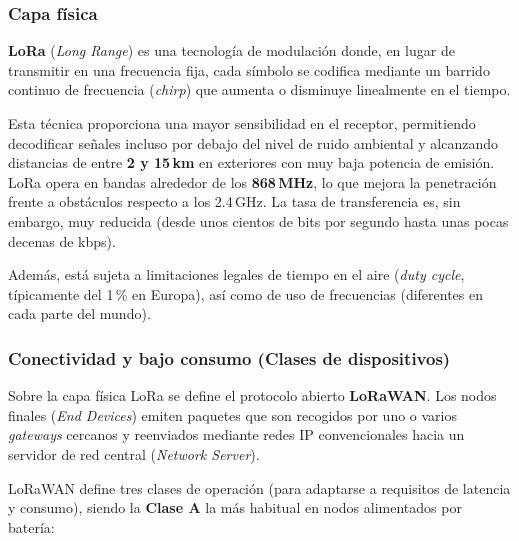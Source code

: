 \documentclass[../main.tex]{subfiles}
\begin{document}
            \subsubsection{Capa física}
                \textbf{LoRa} (\emph{Long Range}) es una tecnología de modulación donde, en lugar de transmitir en una frecuencia fija, cada símbolo se codifica mediante un barrido continuo de frecuencia (\emph{chirp}) que aumenta o disminuye linealmente en el tiempo.

                Esta técnica proporciona una mayor sensibilidad en el receptor, permitiendo decodificar señales incluso por debajo del nivel de ruido ambiental y alcanzando distancias de entre \textbf{2 y 15\,km} en exteriores con muy baja potencia de emisión. LoRa opera en bandas alrededor de los \textbf{868\,MHz}, lo que mejora la penetración frente a obstáculos respecto a los 2.4\,GHz. La tasa de transferencia es, sin embargo, muy reducida (desde unos cientos de bits por segundo hasta unas pocas decenas de kbps). 
                
                Además, está sujeta a limitaciones legales de tiempo en el aire (\emph{duty cycle}, típicamente del 1\,\% en Europa), así como de uso de frecuencias (diferentes en cada parte del mundo).

            \subsubsection{Conectividad y bajo consumo (Clases de dispositivos)}
                Sobre la capa física LoRa se define el protocolo abierto \textbf{LoRaWAN}. Los nodos finales (\emph{End Devices}) emiten paquetes que son recogidos por uno o varios \emph{gateways} cercanos y reenviados mediante redes IP convencionales hacia un servidor de red central (\emph{Network Server}).

                LoRaWAN define tres clases de operación (para adaptarse a requisitos de latencia y consumo), siendo la \textbf{Clase A} la más habitual en nodos alimentados por batería:
\end{document}

